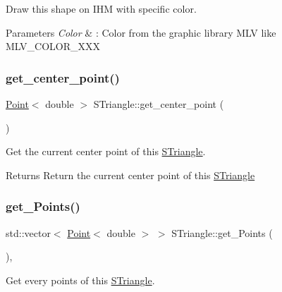 Draw this shape on I\+HM with specific color. 


\begin{DoxyParams}{Parameters}
{\em Color} & \+: Color from the graphic library M\+LV like M\+L\+V\+\_\+\+C\+O\+L\+O\+R\+\_\+\+X\+XX \\
\hline
\end{DoxyParams}
\mbox{\label{classSTriangle_a61228a7f80ee90de80dff8c4e046f51f}} 
\subsubsection{\texorpdfstring{get\+\_\+center\+\_\+point()}{get\_center\_point()}}
{\footnotesize\ttfamily \hyperlink{classPoint}{Point}$<$ double $>$ S\+Triangle\+::get\+\_\+center\+\_\+point (\begin{DoxyParamCaption}{ }\end{DoxyParamCaption})}



Get the current center point of this \hyperlink{classSTriangle}{S\+Triangle}. 

\begin{DoxyReturn}{Returns}
Return the current center point of this \hyperlink{classSTriangle}{S\+Triangle} 
\end{DoxyReturn}
\mbox{\label{classSTriangle_a08f667453619b506b5c16745a9aa5ecf}} 
\subsubsection{\texorpdfstring{get\+\_\+\+Points()}{get\_Points()}}
{\footnotesize\ttfamily std\+::vector$<$ \hyperlink{classPoint}{Point}$<$ double $>$ $>$ S\+Triangle\+::get\+\_\+\+Points (\begin{DoxyParamCaption}{ }\end{DoxyParamCaption})\hspace{0.3cm}{\ttfamily [override]}, {\ttfamily [virtual]}}



Get every points of this \hyperlink{classSTriangle}{S\+Triangle}. 


